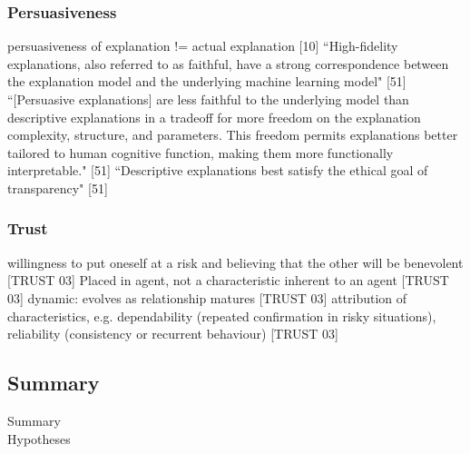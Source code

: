 \subsubsection{Persuasiveness}
persuasiveness of explanation != actual explanation [10]\newline
``High-fidelity explanations, also referred to as faithful, have a strong correspondence between the explanation model and the underlying machine learning model" [51]\newline
``[Persuasive explanations] are less faithful to the underlying model than descriptive explanations in a tradeoff for more freedom on the explanation complexity, structure, and parameters. This freedom permits explanations better tailored to human cognitive function, making them more functionally interpretable." [51]\newline
``Descriptive explanations best satisfy the ethical goal of transparency" [51]\newline


\subsubsection{Trust}
willingness to put oneself at a risk and believing that the other will be benevolent [TRUST 03]\newline
Placed in agent, not a characteristic inherent to an agent [TRUST 03]\newline
dynamic: evolves as relationship matures [TRUST 03]\newline
attribution of characteristics, e.g. dependability (repeated confirmation in risky situations), reliability (consistency or recurrent behaviour) [TRUST 03]\newline



\subsection{Summary}
Summary\\
Hypotheses
